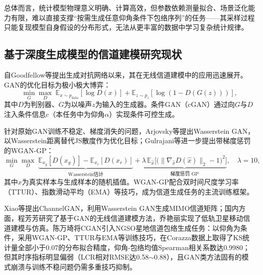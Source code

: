 \documentclass[12pt, a4paper]{ctexart}
\begin{document}
总体而言，统计模型物理意义明确、计算高效，但参数依赖测量拟合、场景泛化能力有限，难以直接支撑“按需生成任意仰角条件下包络序列”的任务——其采样过程只能复现模型自身假设的分布形式，无法从更丰富的数据中学习复杂统计规律。

\subsection{基于深度生成模型的信道建模研究现状}
自Goodfellow等\cite{goodfellow2014generative}提出生成对抗网络以来，其在无线信道建模中的应用迅速展开。GAN的优化目标为极小极大博弈：
\begin{equation}
\min_G \max_D\; \mathbb{E}_{x\sim p_{\text{data}}}[\log D(x)] + \mathbb{E}_{z\sim p_z}[\log(1-D(G(z)))],
\label{eq:gan}
\end{equation}
其中$D$为判别器、$G$为以噪声$z$为输入的生成器。条件GAN（cGAN）通过向$G$与$D$注入条件信息$c$（本任务中为仰角$\alpha$）实现条件可控生成。

针对原始GAN训练不稳定、梯度消失的问题，Arjovsky等提出Wasserstein GAN，以Wasserstein距离替代JS散度作为优化目标；Gulrajani等\cite{gulrajani2017improved}进一步提出带梯度惩罚的WGAN-GP：
\begin{equation}
\min_G \max_D\; \underbrace{\mathbb{E}_{x_g}[D(x_g)] - \mathbb{E}_{x_r}[D(x_r)]}_{\text{Wasserstein估计}} + \underbrace{\lambda\,\mathbb{E}_{\hat{x}}\big[\big(\|\nabla_{\hat{x}} D(\hat{x})\|_2 - 1\big)^2\big]}_{\text{梯度惩罚 GP}},\quad \lambda=10,
\label{eq:wgangp}
\end{equation}
其中$\hat{x}$为真实样本与生成样本的随机插值。WGAN-GP配合双时间尺度学习率（TTUR）、指数滑动平均（EMA）等技巧，成为信道生成任务的主流训练框架。

Xiao等\cite{xiao2022channelgan}提出ChannelGAN，利用Wasserstein GAN生成MIMO信道矩阵；国内方面，程芳芳\cite{cheng2022gan}研究了基于GAN的无线信道建模方法，乔艳丽\cite{qiao2023leo}实现了低轨卫星移动信道建模与仿真。陈万埼\cite{chen2026cgan}将CGAN引入NGSO星地信道包络生成任务：以仰角为条件，采用WGAN-GP、TTUR与EMA等训练技巧，在Corazza数据上取得了KS统计量全部小于0.07的分布拟合精度，仰角-包络均值Spearman相关系数达0.9980；但其时序指标明显偏弱（LCR相对RMSE达0.58$\sim$0.88），且GAN类方法固有的模式崩溃与训练不稳问题仍需多重技巧抑制。
\end{document}
